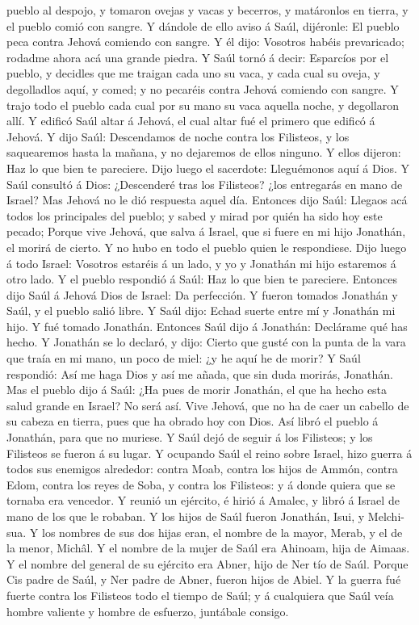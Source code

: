pueblo al despojo, y tomaron ovejas y vacas y becerros, y matáronlos en
tierra, y el pueblo comió con sangre.  Y dándole de ello
aviso á Saúl, dijéronle: El pueblo peca contra Jehová comiendo con
sangre. Y él dijo: Vosotros habéis prevaricado; rodadme ahora acá una
grande piedra.  Y Saúl tornó á decir: Esparcíos por el
pueblo, y decidles que me traigan cada uno su vaca, y cada cual su
oveja, y degolladlos aquí, y comed; y no pecaréis contra Jehová comiendo
con sangre. Y trajo todo el pueblo cada cual por su mano su vaca aquella
noche, y degollaron allí.  Y edificó Saúl altar á Jehová,
el cual altar fué el primero que edificó á Jehová.  Y dijo
Saúl: Descendamos de noche contra los Filisteos, y los saquearemos hasta
la mañana, y no dejaremos de ellos ninguno. Y ellos dijeron: Haz lo que
bien te pareciere. Dijo luego el sacerdote: Lleguémonos aquí á Dios.
 Y Saúl consultó á Dios: ¿Descenderé tras los Filisteos?
¿los entregarás en mano de Israel? Mas Jehová no le dió respuesta aquel
día.  Entonces dijo Saúl: Llegaos acá todos los principales
del pueblo; y sabed y mirad por quién ha sido hoy este pecado;
 Porque vive Jehová, que salva á Israel, que si fuere en mi
hijo Jonathán, el morirá de cierto. Y no hubo en todo el pueblo quien le
respondiese.  Dijo luego á todo Israel: Vosotros estaréis á
un lado, y yo y Jonathán mi hijo estaremos á otro lado. Y el pueblo
respondió á Saúl: Haz lo que bien te pareciere.  Entonces
dijo Saúl á Jehová Dios de Israel: Da perfección. Y fueron tomados
Jonathán y Saúl, y el pueblo salió libre.  Y Saúl dijo:
Echad suerte entre mí y Jonathán mi hijo. Y fué tomado Jonathán.
 Entonces Saúl dijo á Jonathán: Declárame qué has hecho. Y
Jonathán se lo declaró, y dijo: Cierto que gusté con la punta de la vara
que traía en mi mano, un poco de miel: ¿y he aquí he de morir?
 Y Saúl respondió: Así me haga Dios y así me añada, que sin
duda morirás, Jonathán.  Mas el pueblo dijo á Saúl: ¿Ha
pues de morir Jonathán, el que ha hecho esta salud grande en Israel? No
será así. Vive Jehová, que no ha de caer un cabello de su cabeza en
tierra, pues que ha obrado hoy con Dios. Así libró el pueblo á Jonathán,
para que no muriese.  Y Saúl dejó de seguir á los
Filisteos; y los Filisteos se fueron á su lugar.  Y
ocupando Saúl el reino sobre Israel, hizo guerra á todos sus enemigos
alrededor: contra Moab, contra los hijos de Ammón, contra Edom, contra
los reyes de Soba, y contra los Filisteos: y á donde quiera que se
tornaba era vencedor.  Y reunió un ejército, é hirió á
Amalec, y libró á Israel de mano de los que le robaban.  Y
los hijos de Saúl fueron Jonathán, Isui, y Melchi-sua. Y los nombres de
sus dos hijas eran, el nombre de la mayor, Merab, y el de la menor,
Michâl.  Y el nombre de la mujer de Saúl era Ahinoam, hija
de Aimaas. Y el nombre del general de su ejército era Abner, hijo de Ner
tío de Saúl.  Porque Cis padre de Saúl, y Ner padre de
Abner, fueron hijos de Abiel.  Y la guerra fué fuerte
contra los Filisteos todo el tiempo de Saúl; y á cualquiera que Saúl
veía hombre valiente y hombre de esfuerzo, juntábale consigo.

